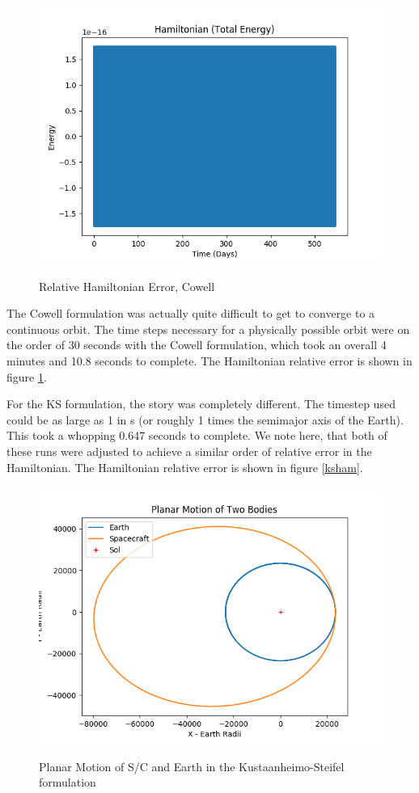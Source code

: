 \documentclass[11pt,twoside,letterpaper]{article}
\begin{document}
  \begin{figure}
    \caption{Relative Hamiltonian Error, Cowell}
    \centering
    \includegraphics[width=\textwidth]{Hamiltonian90}
    \label{cowHam}
  \end{figure}
  
  The Cowell formulation was actually quite difficult to get to
  converge to a continuous orbit. The time steps necessary for a
  physically possible orbit were on the order of 30 seconds with the
  Cowell formulation, which took an overall 4 minutes and 10.8 seconds
  to complete. The Hamiltonian relative error is shown in figure
  \ref{cowHam}.

  For the KS formulation, the story was completely different. The
  timestep used could be as large as 1 in s (or roughly 1 times the
  semimajor axis of the Earth). This took a whopping 0.647 seconds to
  complete. We note here, that both of these runs were adjusted to
  achieve a similar order of relative error in the Hamiltonian. The
  Hamiltonian relative error is shown in figure \ref{ksham}.

  \begin{figure}
    \caption{Planar Motion of S/C and Earth in the Kustaanheimo-Steifel formulation}
    \centering
    \includegraphics[width=\textwidth]{PlanarPathKS}
    \label{kspath}
  \end{figure}
\end{document}
